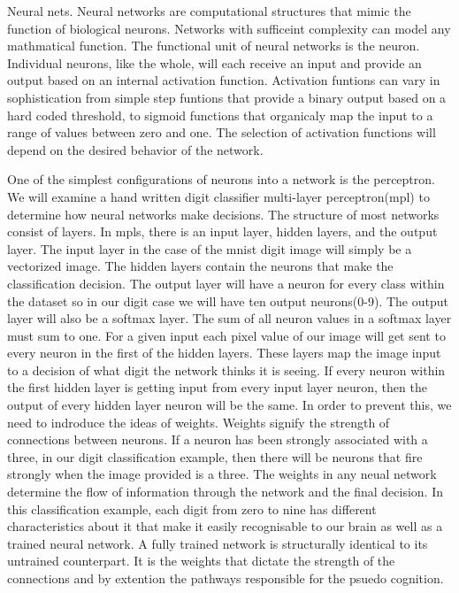 \documentclass{article}
\begin{document}
Neural nets.
Neural networks are computational structures that mimic the function of biological neurons. Networks with sufficeint complexity can model any mathmatical function. 
The functional unit of neural networks is the neuron.
Individual neurons, like the whole, will each receive an input and provide an output based on an internal activation function.
Activation funtions can vary in sophistication from simple step funtions that provide a binary output based on a hard coded threshold, to sigmoid functions that organicaly map the input to a range of values between zero and one.
The selection of activation functions will depend on the desired behavior of the network. 
\par
One of the simplest configurations of neurons into a network is the perceptron. We will examine a hand written digit classifier multi-layer perceptron(mpl)  to determine how neural networks make decisions. The structure of most networks consist of layers. In mpls, there is an input layer, hidden layers, and the output layer. 
The input layer in the case of the mnist digit image will simply be a vectorized image. The hidden layers contain the neurons that make the classification decision. The output layer will have a neuron for every class within the dataset so in our digit case we will have ten output neurons(0-9). The output layer will also be a softmax layer. 
The sum of all neuron values in a softmax layer must sum to one. For a given input each pixel value of our image will get sent to every neuron in the first of the hidden layers. These layers map the image input to a decision of what digit the network thinks it is seeing. If every neuron within the first hidden layer is getting input from every input layer neuron, then the output of every hidden layer neuron will be the same. 
In order to prevent this, we need to indroduce the ideas of weights. Weights signify the strength of connections between neurons. If a neuron has been strongly associated with a three, in our digit classification example, then there will be neurons that fire strongly when the image provided is a three. The weights in any neual network determine the flow of information through the network and the final decision. In this classification example, each digit from zero to nine has different characteristics about it that make it easily recognisable to our brain as well as a trained neural network. A fully trained network is structurally identical to its untrained counterpart. It is the weights that dictate the strength of the connections and by extention the pathways responsible for the psuedo cognition.
\end{document}
